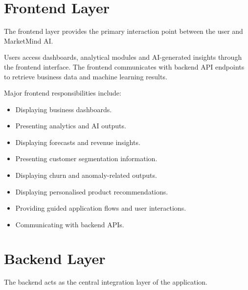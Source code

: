 \documentclass[12pt,a4paper]{report}
\begin{document}

\section{Frontend Layer}

The frontend layer provides the primary interaction point between the
user and MarketMind AI.

Users access dashboards, analytical modules and AI-generated insights
through the frontend interface. The frontend communicates with backend
API endpoints to retrieve business data and machine learning results.

Major frontend responsibilities include:

\begin{itemize}[leftmargin=1.2cm]

\item Displaying business dashboards.

\item Presenting analytics and AI outputs.

\item Displaying forecasts and revenue insights.

\item Presenting customer segmentation information.

\item Displaying churn and anomaly-related outputs.

\item Displaying personalised product recommendations.

\item Providing guided application flows and user interactions.

\item Communicating with backend APIs.

\end{itemize}



\section{Backend Layer}

The backend acts as the central integration layer of the application.
\end{document}
